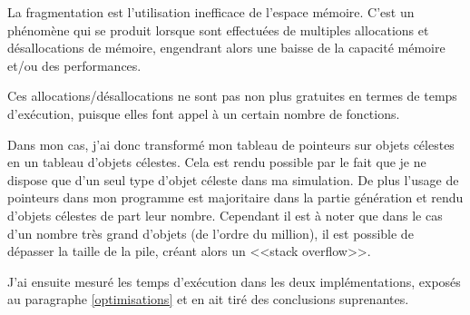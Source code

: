\documentclass[a4paper,french,12pt]{article}
\begin{document}
\begin{description}
	      La fragmentation est l'utilisation inefficace de l'espace mémoire. C'est un phénomène qui se produit lorsque 
	      sont effectuées de multiples allocations et
	      désallocations de mémoire, engendrant alors une baisse de la capacité mémoire et/ou des performances.
	      
	      Ces allocations/désallocations ne sont pas non plus gratuites en termes de temps d'exécution, puisque
	      elles font appel à un certain nombre de fonctions.


	      Dans mon cas, j'ai donc transformé mon tableau de pointeurs sur objets célestes en un tableau d'objets célestes.
	      Cela est rendu possible par le fait que je ne dispose que d'un seul type d'objet céleste dans ma simulation.
	      De plus l'usage de pointeurs dans mon programme est majoritaire dans la partie génération et rendu d'objets célestes
	      de part leur nombre.
	      Cependant il est à noter que dans le cas d'un nombre très grand d'objets (de l'ordre du million), il est possible de dépasser
	      la taille de la pile, créant alors un <<stack overflow>>.
	      
	      J'ai ensuite mesuré les temps d'exécution dans les deux implémentations, exposés au paragraphe \ref{optimisations}
	      et en ait tiré des conclusions suprenantes.
	    
	    \end{description}
	
\end{document}
